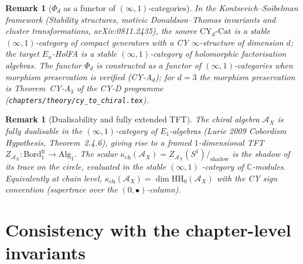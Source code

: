 \documentclass[11pt]{article}
\newtheorem{remark}[theorem]{Remark}
\newcommand{\C}{\mathbb{C}}
\newcommand{\cA}{\mathcal{A}}
\newcommand{\HH}{\mathrm{HH}}
\begin{document}
\begin{remark}[$\Phi_d$ as a functor of $(\infty,1)$-categories]
\label{rem:phi-d-infty-cat}
In the Kontsevich--Soibelman framework
(\emph{Stability structures, motivic Donaldson--Thomas invariants and
cluster transformations}, arXiv:0811.2435), the source
$\mathrm{CY}_d\text{-}\mathrm{Cat}$ is a stable $(\infty,1)$-category
of compact generators with a CY $\infty$-structure of dimension $d$;
the target $E_n$-HolFA is a stable $(\infty,1)$-category of
holomorphic factorisation algebras. The functor $\Phi_d$ is
constructed as a functor of $(\infty,1)$-categories when morphism
preservation is verified (CY-A$_d$); for $d=3$ the morphism
preservation is Theorem~CY-A$_3$ of the CY-D programme
(\texttt{chapters/theory/cy\_to\_chiral.tex}).
\end{remark}

\begin{remark}[Dualisability and fully extended TFT]
\label{rem:dualisability-TFT}
The chiral algebra $\cA_X$ is fully dualisable in the
$(\infty,1)$-category of $E_1$-algebras (Lurie 2009 \emph{Cobordism
Hypothesis}, Theorem~2.4.6), giving rise to a framed
$1$-dimensional TFT $Z_{\cA_X}:\mathrm{Bord}_1^{\mathrm{fr}}\to
\mathrm{Alg}_1$. The scalar
$\kappa_{\mathrm{ch}}(\cA_X)=Z_{\cA_X}(S^1)/_{\mathrm{shadow}}$ is the
shadow of its trace on the circle, evaluated in the stable $(\infty,1)$
-category of $\C$-modules. Equivalently at chain level,
$\kappa_{\mathrm{ch}}(\cA_X)=\dim\HH_0(\cA_X)$ with the CY sign convention
(supertrace over the $(0,\bullet)$-column).
\end{remark}

\section{Consistency with the chapter-level invariants}
\label{sec:cross-consistency}
\end{document}
